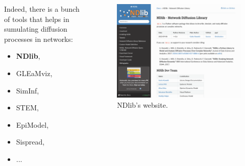 \documentclass{beamer}
\begin{document}
\begin{frame}{\secname}
    \begin{columns}[T]
        \begin{column}{.3\textwidth}
            Indeed, there is a bunch of tools that helps in sumulating diffusion processes in networks:
            \begin{itemize}
                \item \textbf{NDlib}\cite{ndlib},
                \item GLEaMviz\cite{gleam},
                \item SimInf\cite{siminf},
                \item STEM\cite{stem},
                \item EpiModel\cite{jenness2018epimodel},
                \item Sispread\cite{sispread},
                \item ...
            \end{itemize}
        \end{column}
        \hfill
        \begin{column}{.7\textwidth}
            \begin{figure}[ht]
                \centering
                \includegraphics[width=1\textwidth]{figures/ndlib.png}
                \caption{NDlib's website.}
            \end{figure}
        \end{column}
    \end{columns}
\end{frame}
\end{document}
